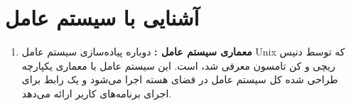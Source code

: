 \section*{آشنایی با سیستم عامل }
\begin{enumerate}
	\item 
	\textbf{معماری سیستم عامل : }
	دوباره پیاده‌سازی سیستم عامل 
	Unix 
	که توسط دنیس ریچی
	و کن تامسون 
	معرفی شد، است. این سیستم عامل با معماری یکپارچه 
	طراحی شده کل سیستم عامل در فضای هسته 
	اجرا می‌شود و یک رابط برای اجرای برنامه‌های کاربر ارائه می‌دهد.
\end{enumerate}